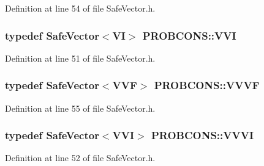 Definition at line 54 of file Safe\+Vector.\+h.

\hypertarget{namespace_p_r_o_b_c_o_n_s_a641706f2197f8a5569b46b7ab218a477}{
\subsubsection[{V\+V\+I}]{\setlength{\rightskip}{0pt plus 5cm}typedef {\bf Safe\+Vector}$<${\bf V\+I}$>$ {\bf P\+R\+O\+B\+C\+O\+N\+S\+::\+V\+V\+I}}}\label{namespace_p_r_o_b_c_o_n_s_a641706f2197f8a5569b46b7ab218a477}


Definition at line 51 of file Safe\+Vector.\+h.

\hypertarget{namespace_p_r_o_b_c_o_n_s_a52a210cf4dfe0ea3c7d83898230cfeaf}{
\subsubsection[{V\+V\+V\+F}]{\setlength{\rightskip}{0pt plus 5cm}typedef {\bf Safe\+Vector}$<${\bf V\+V\+F}$>$ {\bf P\+R\+O\+B\+C\+O\+N\+S\+::\+V\+V\+V\+F}}}\label{namespace_p_r_o_b_c_o_n_s_a52a210cf4dfe0ea3c7d83898230cfeaf}


Definition at line 55 of file Safe\+Vector.\+h.

\hypertarget{namespace_p_r_o_b_c_o_n_s_a503407de78ebd65ad6c605841c125622}{
\subsubsection[{V\+V\+V\+I}]{\setlength{\rightskip}{0pt plus 5cm}typedef {\bf Safe\+Vector}$<${\bf V\+V\+I}$>$ {\bf P\+R\+O\+B\+C\+O\+N\+S\+::\+V\+V\+V\+I}}}\label{namespace_p_r_o_b_c_o_n_s_a503407de78ebd65ad6c605841c125622}


Definition at line 52 of file Safe\+Vector.\+h.



